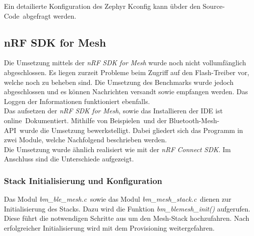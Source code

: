 Ein detailierte Konfiguration des Zephyr Kconfig kann übder den Source-Code\footnotemark\ abgefragt werden. 



\subsection{nRF SDK for Mesh}\label{subsec:BluetoothMeshUmsetzungnRFSDKMesh} 

Die Umsetzung mittels der \textit{nRF SDK for Mesh} wurde noch nicht vollumfänglich abgeschlossen. Es liegen zurzeit Probleme beim Zugriff auf den Flash-Treiber vor, welche noch zu beheben sind. Die Umsetzung des Benchmarks wurde jedoch abgeschlossen und es können Nachrichten versandt sowie empfangen werden. Das Loggen der Informationen funktioniert ebenfalls. \\

Das aufsetzen der \textit{nRF SDK for Mesh}, sowie das Installieren der IDE ist online\footnotemark\ Dokumentiert. Mithilfe von Beispielen\footnotemark\ und der Bluetooth-Mesh-API\footnotemark\ wurde die Umsetzung bewerkstelligt. Dabei gliedert sich das Programm in zwei Module, welche Nachfolgend beschrieben werden.\\

Die Umsetzung wurde ähnlich realisiert wie mit der \textit{nRF Connect SDK}. Im Anschluss sind die Unterschiede aufgezeigt. 






\subsubsection{Stack Initialisierung und Konfiguration}\label{subsubsec:BluetoothMeshUmsetzungnRFSDKInitandConfig} 

Das Modul \textit{bm\_ble\_mesh.c}\footnotemark\ sowie das Modul \textit{bm\_mesh\_stack.c}\footnotemark\ dienen zur Initialisierung des Stacks. Dazu wird die Funktion \textit{bm\_blemesh\_init()} aufgerufen. Diese führt die notwendigen Schritte aus um den Mesh-Stack hochzufahren. Nach erfolgreicher Initialisierung wird mit dem Provisioning weitergefahren. \\



